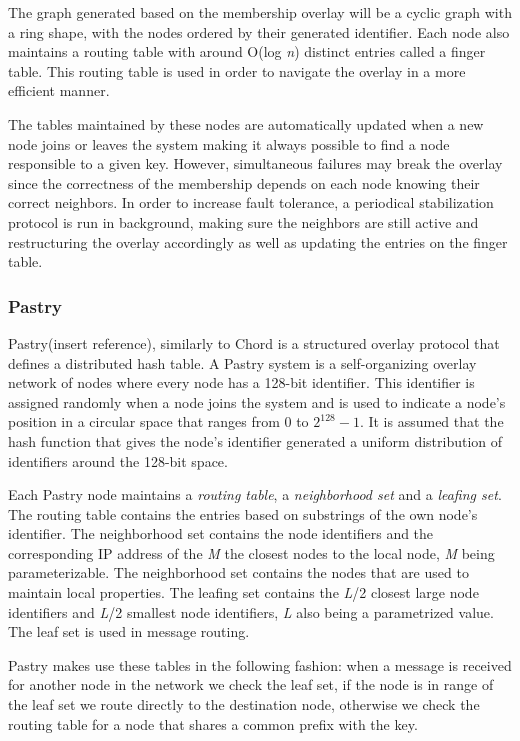 The graph generated based on the membership overlay will be a cyclic graph with
a ring shape, with the nodes ordered by their generated identifier. Each node
also maintains a routing table with around O(log \textit{n}) distinct entries
called a finger table. This routing table is used in order to navigate the overlay
in a more efficient manner.

The tables maintained by these nodes are automatically updated when a new node joins
or leaves the system  making it always possible to find a node responsible to a given
key. However, simultaneous failures may break the overlay since the correctness
of the membership depends on each node knowing their correct neighbors. In order
to increase fault tolerance, a periodical stabilization protocol is run in background,
making sure the neighbors are still active and restructuring the overlay
accordingly as well as updating the entries on the finger table.

\subsubsection{Pastry}
\label{subsec:pastry}

Pastry(insert reference), similarly to Chord is a structured overlay protocol that
defines a distributed hash table. A Pastry system is a self-organizing overlay
network of nodes where every node has a 128-bit identifier. This identifier
is assigned randomly when a node joins the system and is used to indicate a
node's position in a circular space that ranges from 0 to $2^{128}-1$. It is assumed
that the hash function that gives the node's identifier generated a uniform
distribution of identifiers around the 128-bit space.

Each Pastry node maintains a \textit{routing table}, a \textit{neighborhood set}
and a \textit{leafing set}. The routing table contains the entries based
on substrings of the own node's identifier. The neighborhood set contains
the node identifiers and the corresponding IP address of the \textit{M} the closest
nodes to the local node, \textit{M} being parameterizable.  The neighborhood
set contains the nodes that are used to maintain local properties. The leafing
set contains the \textit{L}/2 closest large node identifiers and \textit{L}/2
smallest node identifiers, \textit{L} also being a parametrized value. The
leaf set is used in message routing.

Pastry makes use these tables in the following fashion: when a message is received
for another node in the network we check the leaf set, if the node is in range of
the leaf set we route directly to the destination node, otherwise we check
the routing table for a node that shares a common prefix with the key.

